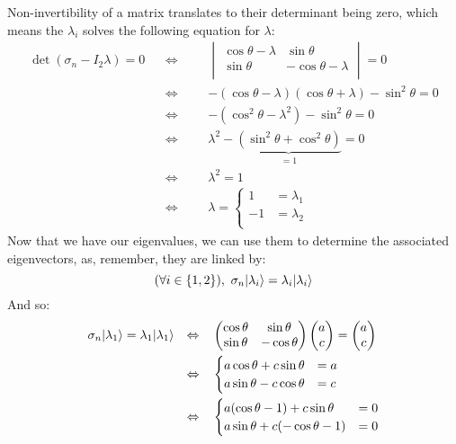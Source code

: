 \documentclass[solutions.tex]{subfiles}
\begin{document}
Non-invertibility of a matrix translates to their determinant being zero,
which means the $\lambda_i$ solves the following equation for $\lambda$:
\begin{equation*}\begin{aligned}
	\det(\sigma_n - I_2\lambda) = 0
	&&\Leftrightarrow&&&
	\begin{vmatrix}
		\cos\theta-\lambda & \sin\theta \\
		\sin\theta & -\cos\theta-\lambda \\
	\end{vmatrix} = 0 \\
	&&\Leftrightarrow&&&
		-(\cos\theta-\lambda)(\cos\theta+\lambda) - \sin^2\theta = 0 \\
	&&\Leftrightarrow&&&
		-(\cos^2\theta-\lambda^2) - \sin^2\theta = 0 \\
	&&\Leftrightarrow&&&
		\lambda^2 - \underbrace{(\sin^2\theta+\cos^2\theta)}_{=1} = 0 \\
	&&\Leftrightarrow&&&
		\lambda^2 = 1 \\
	&&\Leftrightarrow&&&
		\lambda = \begin{cases}
		1  &=\lambda_1 \\
		-1 &=\lambda_2 \\
	\end{cases}
\end{aligned}\end{equation*}
Now that we have our eigenvalues, we can use them to determine the
associated eigenvectors, as, remember, they are linked by:
\[
	(\forall i \in \{1,2\}),\ \sigma_n|\lambda_i\rangle = \lambda_i|\lambda_i\rangle
\]
And so:
\begin{equation*}\begin{aligned}
	\sigma_n|\lambda_1\rangle = \lambda_1|\lambda_1\rangle
	&&\Leftrightarrow&&&
	\begin{pmatrix}
		\cos\theta & \sin\theta \\
		\sin\theta & -\cos\theta \\
	\end{pmatrix}\begin{pmatrix}
		a \\
		c \\
	\end{pmatrix} = \begin{pmatrix}
		a \\
		c \\
	\end{pmatrix} \\
	&&\Leftrightarrow&&&
	\begin{cases}
		a\cos\theta + c\sin\theta & = a \\
		a\sin\theta - c\cos\theta & = c \\
	\end{cases} \\
	&&\Leftrightarrow&&&
	\begin{cases}
		a(\cos\theta - 1) + c\sin\theta & = 0 \\
		a\sin\theta + c(-\cos\theta-1) & = 0 \\
	\end{cases}
\end{aligned}\end{equation*}
\end{document}
